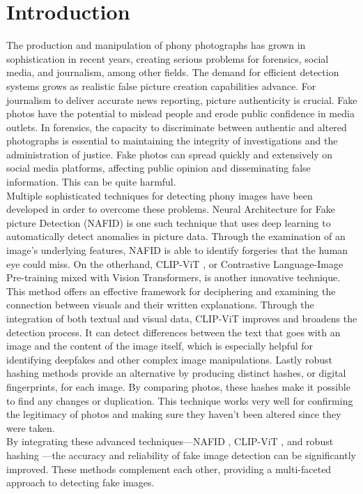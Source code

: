 \documentclass[a4paper,14pt]{report}
\begin{document}
\chapter{Introduction}
The production and manipulation of phony photographs has grown in sophistication in recent years, creating serious problems for forensics, social media, and journalism, among other fields. The demand for efficient detection systems grows as realistic false picture creation capabilities advance. For journalism to deliver accurate news reporting, picture authenticity is crucial. Fake photos have the potential to mislead people and erode public confidence in media outlets. In forensics, the capacity to discriminate between authentic and altered photographs is essential to maintaining the integrity of investigations and the administration of justice. Fake photos can spread quickly and extensively on social media platforms, affecting public opinion and disseminating false information. This can be quite harmful.\\
Multiple sophisticated techniques for detecting phony images have been developed in order to overcome these problems. Neural Architecture for Fake picture Detection (NAFID) \cite{1} is one such technique that uses deep learning to automatically detect anomalies in picture data. Through the examination of an image's underlying features, NAFID \cite{1} is able to identify forgeries that the human eye could miss. On the otherhand, CLIP-ViT \cite{2} , or Contrastive Language-Image Pre-training mixed with Vision Transformers, is another innovative technique. This method offers an effective framework for deciphering and examining the connection between visuals and their written explanations. Through the integration of both textual and visual data, CLIP-ViT \cite{2} improves and broadens the detection process. It can detect differences between the text that goes with an image and the content of the image itself, which is especially helpful for identifying deepfakes and other complex image manipulations. Lastly robust hashing \cite{3} methods provide an alternative by producing distinct hashes, or digital fingerprints, for each image. By comparing photos, these hashes make it possible to find any changes or duplication. This technique works very well for confirming the legitimacy of photos and making sure they haven't been altered since they were taken.\\
By integrating these advanced techniques—NAFID \cite{1}, CLIP-ViT \cite{2}, and robust hashing \cite{3} —the accuracy and reliability of fake image detection can be significantly improved. These methods complement each other, providing a multi-faceted approach to detecting fake images.
\end{document}
